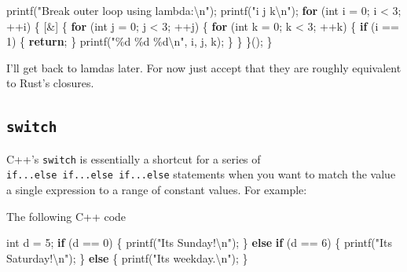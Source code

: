 \documentclass[
]{book}
\newenvironment{Shaded}{\begin{snugshade}}{\end{snugshade}}
\newcommand{\ControlFlowTok}[1]{\textcolor[rgb]{0.13,0.29,0.53}{\textbf{#1}}}
\newcommand{\DataTypeTok}[1]{\textcolor[rgb]{0.13,0.29,0.53}{#1}}
\newcommand{\DecValTok}[1]{\textcolor[rgb]{0.00,0.00,0.81}{#1}}
\newcommand{\NormalTok}[1]{#1}
\newcommand{\SpecialCharTok}[1]{\textcolor[rgb]{0.00,0.00,0.00}{#1}}
\newcommand{\StringTok}[1]{\textcolor[rgb]{0.31,0.60,0.02}{#1}}
\begin{document}
\begin{Shaded}
\begin{Highlighting}[]
\NormalTok{printf(}\StringTok{"Break outer loop using lambda:}\SpecialCharTok{\textbackslash{}n}\StringTok{"}\NormalTok{);}
\NormalTok{printf(}\StringTok{"i j k}\SpecialCharTok{\textbackslash{}n}\StringTok{"}\NormalTok{);}
\ControlFlowTok{for}\NormalTok{ (}\DataTypeTok{int}\NormalTok{ i = }\DecValTok{0}\NormalTok{; i \textless{} }\DecValTok{3}\NormalTok{; ++i)}
\NormalTok{\{}
\NormalTok{    [\&] \{}
        \ControlFlowTok{for}\NormalTok{ (}\DataTypeTok{int}\NormalTok{ j = }\DecValTok{0}\NormalTok{; j \textless{} }\DecValTok{3}\NormalTok{; ++j)}
\NormalTok{        \{}
            \ControlFlowTok{for}\NormalTok{ (}\DataTypeTok{int}\NormalTok{ k = }\DecValTok{0}\NormalTok{; k \textless{} }\DecValTok{3}\NormalTok{; ++k)}
\NormalTok{            \{}
                \ControlFlowTok{if}\NormalTok{ (i == }\DecValTok{1}\NormalTok{)}
\NormalTok{                \{}
                    \ControlFlowTok{return}\NormalTok{;}
\NormalTok{                \}}
\NormalTok{                printf(}\StringTok{"}\SpecialCharTok{\%d}\StringTok{ }\SpecialCharTok{\%d}\StringTok{ }\SpecialCharTok{\%d\textbackslash{}n}\StringTok{"}\NormalTok{, i, j, k);}
\NormalTok{            \}}
\NormalTok{        \}}
\NormalTok{    \}();}
\NormalTok{\}}
\end{Highlighting}
\end{Shaded}

I'll get back to lamdas later. For now just accept that they are roughly equivalent to Rust's closures.

\hypertarget{switch}{%
\subsection{\texorpdfstring{\texttt{switch}}{switch}}\label{switch}}

C++'s \texttt{switch} is essentially a shortcut for a series of \texttt{if...else\ if...else\ if...else} statements when you want to match the value a single expression to a range of constant values. For example:

The following C++ code

\begin{Shaded}
\begin{Highlighting}[]
\DataTypeTok{int}\NormalTok{ d = }\DecValTok{5}\NormalTok{;}
\ControlFlowTok{if}\NormalTok{ (d == }\DecValTok{0}\NormalTok{) \{}
\NormalTok{    printf(}\StringTok{"It\textquotesingle{}s Sunday!}\SpecialCharTok{\textbackslash{}n}\StringTok{"}\NormalTok{);}
\NormalTok{\} }\ControlFlowTok{else} \ControlFlowTok{if}\NormalTok{ (d == }\DecValTok{6}\NormalTok{) \{}
\NormalTok{    printf(}\StringTok{"It\textquotesingle{}s Saturday!}\SpecialCharTok{\textbackslash{}n}\StringTok{"}\NormalTok{);}
\NormalTok{\} }\ControlFlowTok{else}\NormalTok{ \{}
\NormalTok{    printf(}\StringTok{"It\textquotesingle{}s weekday.}\SpecialCharTok{\textbackslash{}n}\StringTok{"}\NormalTok{);}
\NormalTok{\}}
\end{Highlighting}
\end{Shaded}
\end{document}
